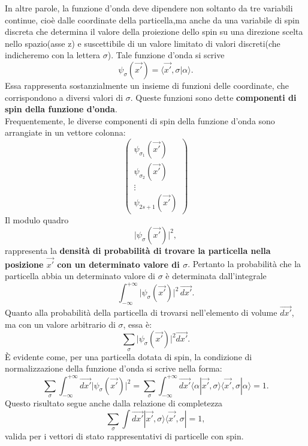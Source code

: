 In altre parole, la funzione d'onda deve dipendere non soltanto da tre variabili continue, cioè dalle coordinate della particella,ma anche da una variabile di spin discreta che determina il valore della proiezione dello spin su una direzione scelta nello spazio(asse z) e suscettibile di un valore limitato di valori discreti(che indicheremo con la lettera $\sigma$). Tale funzione d'onda si scrive
\begin{equation}
\psi_{\sigma}(\vec{x'})=\langle\vec{x'}, \sigma|\alpha\rangle .
\end{equation} 
Essa rappresenta sostanzialmente un insieme di funzioni delle coordinate, che corrispondono a diversi valori di $\sigma$. Queste funzioni sono dette \textbf{componenti di spin della funzione d'onda}.\\ Frequentemente, le diverse componenti di spin della funzione d'onda sono arrangiate in un vettore colonna:
\[
\begin{pmatrix}
\psi_{\sigma_1}(\vec{x'})\\ \psi_{\sigma_2}(\vec{x'})\\ \vdots \\\psi_{2s+1}(\vec{x'})
\end{pmatrix}
\] 
Il modulo quadro 
\begin{equation}
\vert\psi_{\sigma}(\vec{x'})\vert^{2}  , 
\end{equation}
rappresenta la \textbf{densità di probabilità di trovare la particella nella posizione $\vec{x'}$ con un determinato valore di $\sigma$}. Pertanto la probabilità che la particella abbia un determinato valore di $\sigma$ è determinata dall'integrale
\begin{equation}
\int_{-\infty}^{+\infty} \vert\psi_{\sigma}(\vec{x'})\vert^{2}\,\vec{dx'} .
\end{equation}
Quanto alla probabilità della particella di trovarsi nell'elemento di volume $\vec{dx'}$, ma con un valore arbitrario di $\sigma$, essa è:
\begin{equation}
\sum_{\sigma} \vert\psi_{\sigma}(\vec{x'})\vert^{2}\vec{dx'}  .
\end{equation}
È evidente come, per una particella dotata di spin, la condizione di normalizzazione della funzione d'onda si scrive nella forma:
\begin{equation}
\sum_{\sigma} \int_{-\infty}^{+\infty}\vec{dx'}\vert\psi_{\sigma}(\vec{x'})\vert^{2}=\sum_{\sigma} \int_{-\infty}^{+\infty}\vec{dx'}\langle\alpha|\vec{x'}, \sigma\rangle\langle\vec{x'}, \sigma|\alpha\rangle=1 .
\end{equation}
Questo risultato segue anche dalla relazione di completezza
\begin{equation}
\sum_{\sigma} \int \vec{dx'}|\vec{x'}, \sigma\rangle\langle\vec{x'}, \sigma|=1 ,
\end{equation}
valida per i vettori di stato rappresentativi di particelle con spin.
